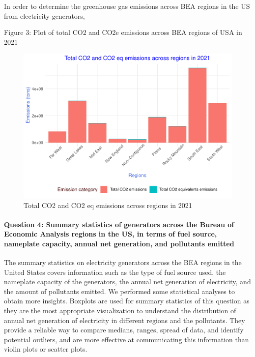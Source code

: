 \documentclass[
]{article}
\begin{document}
In order to determine the greenhouse gas emissions across BEA regions in
the US from electricity generators,

Figure 3: Plot of total CO2 and CO2e emissions across BEA regions of USA
in 2021

\begin{figure}

{\centering \includegraphics{EDA_Project_Mutha_Kry_Ghosh_VS_files/figure-latex/Q3plot-1} 

}

\caption{Total CO2 and CO2 eq emissions across regions in 2021}\label{fig:Q3plot}
\end{figure}

\hypertarget{question-4-summary-statistics-of-generators-across-the-bureau-of-economic-analysis-regions-in-the-us-in-terms-of-fuel-source-nameplate-capacity-annual-net-generation-and-pollutants-emitted}{%
\paragraph{Question 4: Summary statistics of generators across the
Bureau of Economic Analysis regions in the US, in terms of fuel source,
nameplate capacity, annual net generation, and pollutants
emitted}\label{question-4-summary-statistics-of-generators-across-the-bureau-of-economic-analysis-regions-in-the-us-in-terms-of-fuel-source-nameplate-capacity-annual-net-generation-and-pollutants-emitted}}

The summary statistics on electricity generators across the BEA regions
in the United States covers information such as the type of fuel source
used, the nameplate capacity of the generators, the annual net
generation of electricity, and the amount of pollutants emitted. We
performed some statistical analyses to obtain more insights. Boxplots
are used for summary statistics of this question as they are the most
appropriate visualization to understand the distribution of annual net
generation of electricity in different regions and the pollutants. They
provide a reliable way to compare medians, ranges, spread of data, and
identify potential outliers, and are more effective at communicating
this information than violin plots or scatter plots.
\end{document}
